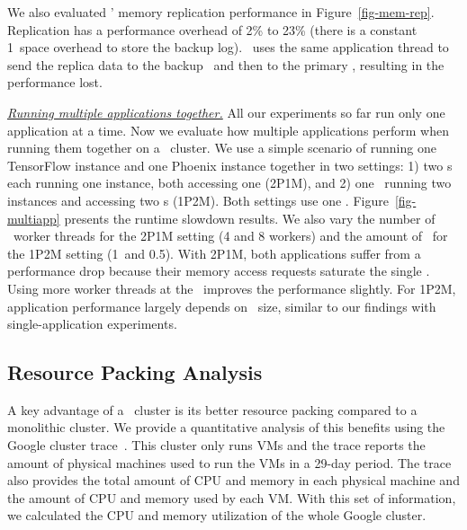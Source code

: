 We also evaluated \lego' memory replication performance in Figure~\ref{fig-mem-rep}.
Replication has a performance overhead of 2\% to 23\% (there is a constant 1\MB\ space overhead to store the backup log).
\lego\ uses the same application thread to send the replica data to the backup \mcomponent\ and then 
to the primary \mcomponent, resulting in the performance lost. 

\textit{\uline{Running multiple applications together.}}
All our experiments so far run only one application at a time.
Now we evaluate how multiple applications perform when running them together on a \lego\ cluster.
We use a simple scenario of running one TensorFlow instance and one Phoenix instance together in two settings:
1) two \pcomponent{}s each running one instance, both accessing one \mcomponent (2P1M),
and 2) one \pcomponent\ running two instances and accessing two \mcomponent{}s (1P2M).
Both settings use one \scomponent. Figure~\ref{fig-multiapp} presents the runtime slowdown results.
We also vary the number of \mcomponent\ worker threads for the 2P1M setting (4 and 8 workers)
and the amount of \excache\ for the 1P2M setting (1\GB\ and 0.5\GB).
With 2P1M, both applications suffer from a performance drop
because their memory access requests saturate the single \mcomponent.
Using more worker threads at the \mcomponent\ improves the performance slightly.
For 1P2M, application performance largely depends on \excache\ size, similar to our findings with single-application experiments.



\subsection{Resource Packing Analysis}
\label{sec:cost}
A key advantage of a \lego\ cluster is its better resource packing compared to a monolithic cluster.
We provide a quantitative analysis of this benefits using the Google cluster trace~\cite{GoogleTrace}.
This cluster only runs VMs and the trace reports the amount of physical machines used to run the VMs 
in a 29-day period. 
The trace also provides the total amount of CPU and memory in each physical machine
and the amount of CPU and memory used by each VM.
With this set of information, we calculated the CPU and memory utilization of the whole Google cluster.


